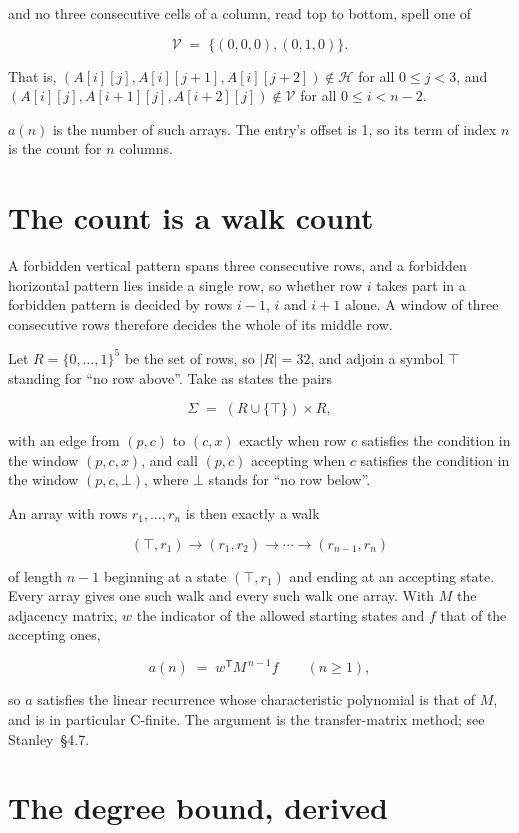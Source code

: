 \documentclass[11pt]{article}
\theoremstyle{definition}
\begin{document}
and no three consecutive cells of a column, read top to bottom, spell one of

\[\mathcal{V} \;=\; \{(0,0,0), (0,1,0)\}.\]

That is, $(A[i][j],A[i][j{+}1],A[i][j{+}2]) \notin \mathcal{H}$ for all $0 \le j < 3$, and $(A[i][j],A[i{+}1][j],A[i{+}2][j]) \notin \mathcal{V}$ for all $0 \le i < n-2$.

$a(n)$ is the number of such arrays. The entry's offset is 1, so its term of index $n$ is the count for $n$ columns.

\section{The count is a walk count}

A forbidden vertical pattern spans three consecutive rows, and a forbidden horizontal pattern lies inside a single row, so whether row $i$ takes part in a forbidden pattern is decided by rows $i-1$, $i$ and $i+1$ alone. A window of three consecutive rows therefore decides the whole of its middle row.

Let $R = \{0,\dots,1\}^{5}$ be the set of rows, so $|R| = 32$, and adjoin a symbol $\top$ standing for ``no row above''. Take as states the pairs

\[\Sigma \;=\; (R \cup \{\top\}) \times R,\]

with an edge from $(p,c)$ to $(c,x)$ exactly when row $c$ satisfies the condition in the window $(p,c,x)$, and call $(p,c)$ accepting when $c$ satisfies the condition in the window $(p,c,\bot)$, where $\bot$ stands for ``no row below''.

An array with rows $r_1,\dots,r_n$ is then exactly a walk

\[(\top,r_1) \to (r_1,r_2) \to \cdots \to (r_{n-1},r_n)\]

of length $n-1$ beginning at a state $(\top,r_1)$ and ending at an accepting state. Every array gives one such walk and every such walk one array. With $M$ the adjacency matrix, $w$ the indicator of the allowed starting states and $f$ that of the accepting ones,

\[a(n) \;=\; w^{\mathsf T} M^{\,n-1} f \qquad (n \ge 1),\]

so $a$ satisfies the linear recurrence whose characteristic polynomial is that of $M$, and is in particular C-finite. The argument is the transfer-matrix method; see Stanley~\S4.7.

\section{The degree bound, derived}
\end{document}
